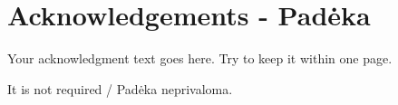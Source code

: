 
\chapter*{Acknowledgements - Padėka}
\label{cha:acknowledgements}



Your acknowledgment text goes here. Try to keep it within one page.

It is not required / Padėka neprivaloma.

